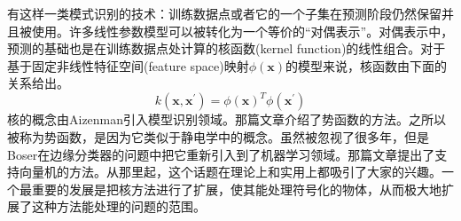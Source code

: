 有这样一类模式识别的技术：训练数据点或者它的一个子集在预测阶段仍然保留并且被使用。许多线性参数模型可以被转化为一个等价的“对偶表示”。对偶表示中，预测的基础也是在训练数据点处计算的核函数(kernel function)的线性组合。对于基于固定非线性特征空间(feature space)映射$\phi(\boldsymbol{x})$的模型来说，核函数由下面的关系给出。
\begin{equation}
\label{kernel}
	k(\boldsymbol{x},\boldsymbol{x}^{'})=\phi(\boldsymbol{x})^T\phi(\boldsymbol{x}^{'})
\end{equation}
核的概念由Aizenman引入模型识别领域。那篇文章介绍了势函数的方法。之所以被称为势函数，是因为它类似于静电学中的概念。虽然被忽视了很多年，但是Boser在边缘分类器的问题中把它重新引入到了机器学习领域。那篇文章提出了支持向量机的方法。从那里起，这个话题在理论上和实用上都吸引了大家的兴趣。一个最重要的发展是把核方法进行了扩展，使其能处理符号化的物体，从而极大地扩展了这种方法能处理的问题的范围。